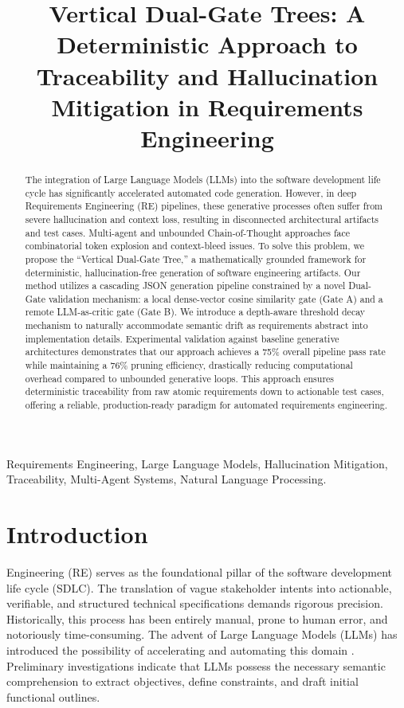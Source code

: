\documentclass[journal]{IEEEtran}
\begin{document}
\title{Vertical Dual-Gate Trees: A Deterministic Approach to Traceability and Hallucination Mitigation in Requirements Engineering}

\author{
}

\maketitle

\begin{abstract}
The integration of Large Language Models (LLMs) into the software development life cycle has significantly accelerated automated code generation. However, in deep Requirements Engineering (RE) pipelines, these generative processes often suffer from severe hallucination and context loss, resulting in disconnected architectural artifacts and test cases. Multi-agent and unbounded Chain-of-Thought approaches face combinatorial token explosion and context-bleed issues. To solve this problem, we propose the ``Vertical Dual-Gate Tree,'' a mathematically grounded framework for deterministic, hallucination-free generation of software engineering artifacts. Our method utilizes a cascading JSON generation pipeline constrained by a novel Dual-Gate validation mechanism: a local dense-vector cosine similarity gate (Gate A) and a remote LLM-as-critic gate (Gate B). We introduce a depth-aware threshold decay mechanism to naturally accommodate semantic drift as requirements abstract into implementation details. Experimental validation against baseline generative architectures demonstrates that our approach achieves a 75\% overall pipeline pass rate while maintaining a 76\% pruning efficiency, drastically reducing computational overhead compared to unbounded generative loops. This approach ensures deterministic traceability from raw atomic requirements down to actionable test cases, offering a reliable, production-ready paradigm for automated requirements engineering.
\end{abstract}

\begin{IEEEkeywords}
Requirements Engineering, Large Language Models, Hallucination Mitigation, Traceability, Multi-Agent Systems, Natural Language Processing.
\end{IEEEkeywords}

\section{Introduction}
 Engineering (RE) serves as the foundational pillar of the software development life cycle (SDLC). The translation of vague stakeholder intents into actionable, verifiable, and structured technical specifications demands rigorous precision. Historically, this process has been entirely manual, prone to human error, and notoriously time-consuming. The advent of Large Language Models (LLMs) has introduced the possibility of accelerating and automating this domain \cite{llm_re_slr2024}. Preliminary investigations indicate that LLMs possess the necessary semantic comprehension to extract objectives, define constraints, and draft initial functional outlines.
\end{document}
